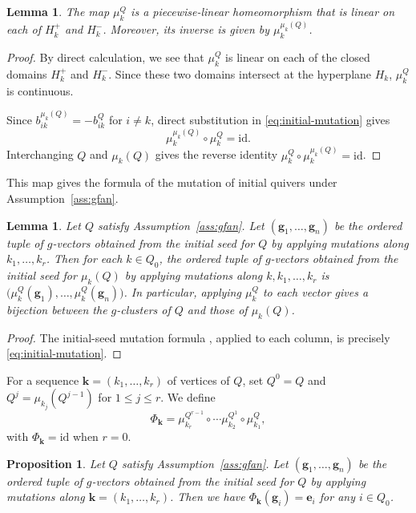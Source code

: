 \documentclass[11pt,reqno]{amsart}
\numberwithin{equation}{section}
\theoremstyle{definition}
\theoremstyle{plain}
\newtheorem{lemma}[example]{Lemma}
\newtheorem{proposition}[example]{Proposition}
\begin{document}
  \begin{lemma}\label{lem:homofg-fanmut}
    The map $\mu_k^Q$ is a piecewise-linear homeomorphism that is linear on each of $H_k^{+}$ and $H_k^{-}$. Moreover, its inverse is given by $\mu_k^{\mu_k(Q)}$.
  \end{lemma}
  \begin{proof}
    By direct calculation, we see that $\mu_k^Q$ is linear on each of the closed domains $H_k^{+}$ and $H_k^{-}$. Since these two domains intersect at the hyperplane $H_k$, $\mu_k^Q$ is continuous.

    Since $b_{ik}^{\mu_k(Q)}=-b_{ik}^Q$ for $i\neq k$, direct substitution in \eqref{eq:initial-mutation} gives
		\[
		\mu_k^{\mu_k(Q)}\circ\mu_k^Q=\mathrm{id}.
		\]
		Interchanging $Q$ and $\mu_k(Q)$ gives the reverse identity $\mu_k^Q \circ \mu_k^{\mu_k(Q)} = \mathrm{id}$.
  \end{proof}
  This map gives the formula of the mutation of initial quivers under Assumption~\ref{ass:gfan}.
  \begin{lemma}\label{lem:initial-seed-mut}
    Let $Q$ satisfy Assumption~\ref{ass:gfan}. Let $(\mathbf{g}_1,\ldots,\mathbf{g}_n)$ be the ordered tuple of $g$-vectors obtained from the initial seed for $Q$ by applying mutations along $k_1,\dots,k_r$. Then for each $k\in Q_0$, the ordered tuple of $g$-vectors obtained from the initial seed for $\mu_k(Q)$ by applying mutations along $k,k_1,\ldots,k_r$ is $\bigl(\mu_k^Q(\mathbf{g}_1),\ldots,\mu_k^Q(\mathbf{g}_n)\bigr)$. In particular, applying $\mu_k^Q$ to each vector gives a bijection between the $g$-clusters of $Q$ and those of $\mu_k(Q)$.
  \end{lemma}
  \begin{proof}
    The initial-seed mutation formula \cite[Proposition~6.1(c), equation~(6.2)]{AC25}, applied to each column, is precisely \eqref{eq:initial-mutation}.
  \end{proof}

  For a sequence $\mathbf{k} = (k_1,\dots,k_r)$ of vertices of $Q$, set $Q^0 = Q$ and $Q^{j} = \mu_{k_{j}}(Q^{j-1})$ for $1\leq j\leq r$. We define
  \[
  \Phi_{\mathbf{k}} = \mu_{k_r}^{Q^{r-1}} \circ \cdots \mu_{k_2}^{Q^1} \circ \mu_{k_1}^Q,
  \]
  with $\Phi_{\mathbf{k}}=\mathrm{id}$ when $r=0$.

  \begin{proposition}\label{prop:comp-of-initialmutation}
    Let $Q$ satisfy Assumption~\ref{ass:gfan}. Let $(\mathbf{g}_1,\ldots,\mathbf{g}_n)$ be the ordered tuple of $g$-vectors obtained from the initial seed for $Q$ by applying mutations along $\mathbf{k}=(k_1,\ldots,k_r)$. Then we have $\Phi_{\mathbf{k}}(\mathbf{g}_i) = \mathbf{e}_i$ for any $i\in Q_0$.
  \end{proposition}
\end{document}
